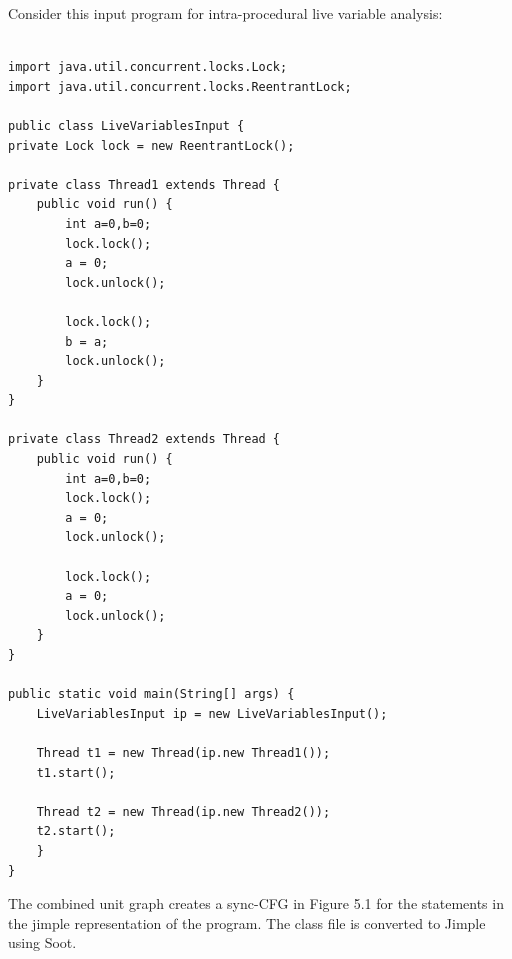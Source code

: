 Consider this input program for intra-procedural live variable analysis:  
\begin{lstlisting}

import java.util.concurrent.locks.Lock;
import java.util.concurrent.locks.ReentrantLock;

public class LiveVariablesInput {
private Lock lock = new ReentrantLock();

private class Thread1 extends Thread {
	public void run() {
		int a=0,b=0;
		lock.lock();
		a = 0;
		lock.unlock();
		
		lock.lock();
		b = a;
		lock.unlock();
	}
}

private class Thread2 extends Thread {
	public void run() {
		int a=0,b=0;
		lock.lock();
		a = 0;
		lock.unlock();
		
		lock.lock();
		a = 0;
		lock.unlock();
	}
}

public static void main(String[] args) {
	LiveVariablesInput ip = new LiveVariablesInput();
	
	Thread t1 = new Thread(ip.new Thread1());
	t1.start();
	
	Thread t2 = new Thread(ip.new Thread2());
	t2.start();
	}
}
\end{lstlisting} 

The combined unit graph creates a sync-CFG in Figure 5.1 for the statements in the jimple representation of the program. The class file is converted to Jimple using Soot.

